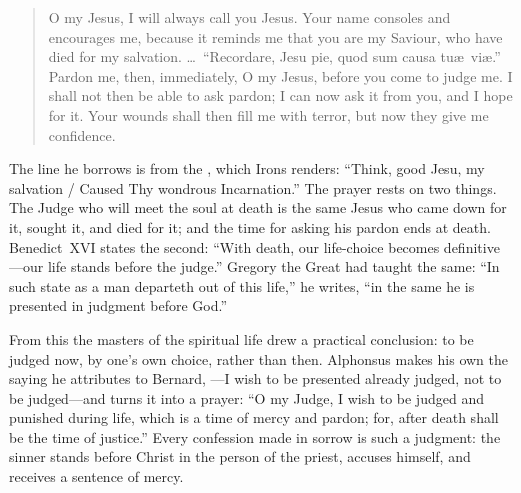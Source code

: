 \begin{quote}
O my Jesus, I will always call you Jesus. Your name consoles and encourages me, because it reminds me that you are my Saviour, who have died for my salvation. \ldots\ ``Recordare, Jesu pie, quod sum causa tu\ae\ vi\ae.'' Pardon me, then, immediately, O my Jesus, before you come to judge me. I shall not then be able to ask pardon; I can now ask it from you, and I hope for it. Your wounds shall then fill me with terror, but now they give me confidence.
\end{quote}

The line he borrows is from the , which Irons renders: ``Think, good Jesu, my salvation / Caused Thy wondrous Incarnation.'' The prayer rests on two things. The Judge who will meet the soul at death is the same Jesus who came down for it, sought it, and died for it; and the time for asking his pardon ends at death. Benedict~XVI states the second: ``With death, our life-choice becomes definitive---our life stands before the judge.'' Gregory the Great had taught the same: ``In such state as a man departeth out of this life,'' he writes, ``in the same he is presented in judgment before God.''

From this the masters of the spiritual life drew a practical conclusion: to be judged now, by one's own choice, rather than then. Alphonsus makes his own the saying he attributes to Bernard, ---I wish to be presented already judged, not to be judged---and turns it into a prayer: ``O my Judge, I wish to be judged and punished during life, which is a time of mercy and pardon; for, after death shall be the time of justice.'' Every confession made in sorrow is such a judgment: the sinner stands before Christ in the person of the priest, accuses himself, and receives a sentence of mercy.
